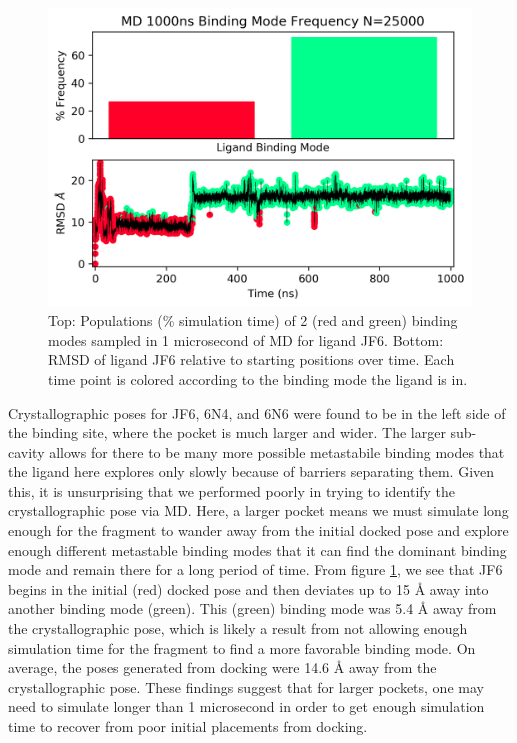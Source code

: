 \begin{figure}
    \centering
    \includegraphics[width=\linewidth]{chapter5/JF6/JF6_1_c0-full-bmodes-freq.png}
    \caption[Ligand JF6 Binding Mode Populations]{Top: Populations (\% simulation time) of 2 (red and green) binding modes sampled in 1 microsecond of MD for ligand JF6. Bottom: RMSD of ligand JF6 relative to starting positions over time. Each time point is colored according to the binding mode the ligand is in.}
    \label{fig:JF6_bmodes}
\end{figure}

Crystallographic poses for JF6, 6N4, and 6N6 were found to be in the left side of the binding site, where the pocket is much larger and wider.
The larger sub-cavity allows for there to be many more possible metastabile binding modes that the ligand here explores only slowly because of barriers separating them.
Given this, it is unsurprising that we performed poorly in trying to identify the crystallographic pose via MD.
Here, a larger pocket means we must simulate long enough for the fragment to wander away from the initial docked pose and explore enough different metastable binding modes that it can find the dominant binding mode and remain there for a long period of time.
From figure \ref{fig:JF6_bmodes}, we see that JF6 begins in the initial (red) docked pose and then deviates up to 15 {\AA} away into another binding mode (green).
This (green) binding mode was 5.4 {\AA} away from the crystallographic pose, which is likely a result from not allowing enough simulation time for the fragment to find a more favorable binding mode.
On average, the poses generated from docking were 14.6 {\AA} away from the crystallographic pose.
These findings suggest that for larger pockets, one may need to simulate longer than 1 microsecond in order to get enough simulation time to recover from poor initial placements from docking.

